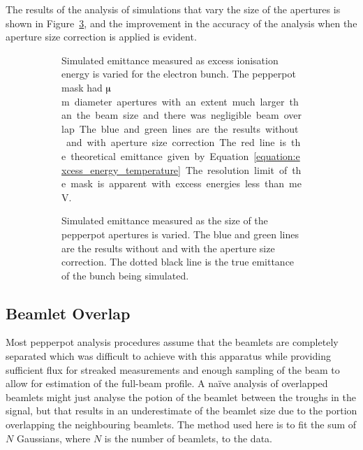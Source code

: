The results of the analysis of simulations that vary the size of the apertures is shown in Figure~\ref{figure:aperture_size_sim}, and the improvement in the accuracy of the analysis when the aperture size correction is applied is evident.

\begin{figure}
\begin{subfigure}[b]{\textwidth}
    \center
    
    \caption[Results of a simulation investigating the efficacy of the aperture size correction for various electron excess energies.]{Simulated emittance measured as excess ionisation energy is varied for the electron bunch.
    The pepperpot mask had \unit[50]{$\muup$m} diameter apertures with an extent much larger than the beam size and there was negligible beam overlap.
    The blue and green lines are the results without and with aperture size correction.
    The red line is the theoretical emittance given by Equation~\ref{equation:excess_energy_temperature}.
    The resolution limit of the mask is apparent with excess energies less than \unit[10]{meV}.}
    \label{figure:wavelength_sim}
\end{subfigure}

\begin{subfigure}[b]{\textwidth}
    \center
    
    \caption[Results of a simulation investigating the efficacy of the aperture size correction for various aperture sizes.]{Simulated emittance measured as the size of the pepperpot apertures is varied. The blue and green lines are the results without and with the aperture size correction. The dotted black line is the true emittance of the bunch being simulated.}
    \label{figure:aperture_size_sim}
\end{subfigure}
    \caption[Results of a simulations investigating the efficacy of the aperture size correction for various excess energies and aperture sizes.]{}
\end{figure}

\subsection{Beamlet Overlap}\label{section:overlap_correction}
Most pepperpot analysis procedures assume that the beamlets are completely separated which was difficult to achieve with this apparatus while providing sufficient flux for streaked measurements and enough sampling of the beam to allow for estimation of the full-beam profile.
A na\"ive analysis of overlapped beamlets might just analyse the potion of the beamlet between the troughs in the signal, but that results in an underestimate of the beamlet size due to the portion overlapping the neighbouring beamlets.
The method used here is to fit the sum of $N$ Gaussians, where $N$ is the number of beamlets, to the data.

